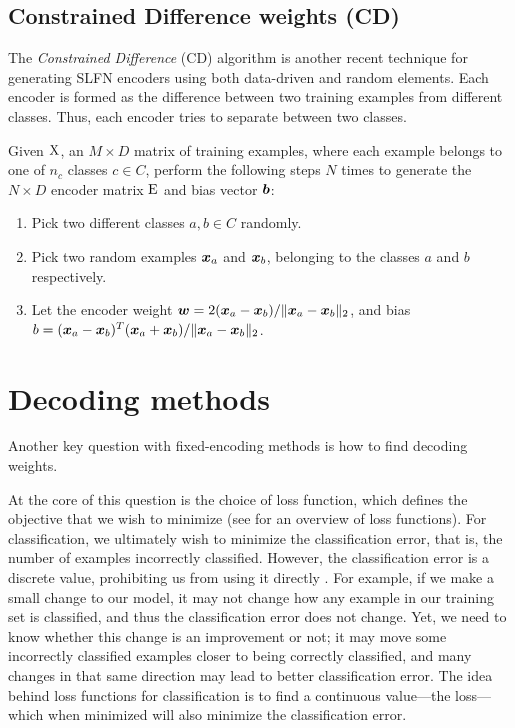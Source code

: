 \subsection{Constrained Difference weights (CD)}

The \emph{Constrained Difference} (CD) algorithm \parencite{Zhu2015}
is another recent technique for generating SLFN encoders
using both data-driven and random elements.
Each encoder is formed as the difference between two training examples
from different classes.
Thus, each encoder tries to separate between two classes.

Given $\mathrm{X}$, an $M \times D$ matrix of training examples,
where each example belongs to one of $n_c$ classes $c \in C$,
perform the following steps $N$ times
to generate the $N \times D$ encoder matrix $\mathrm{E}$
and bias vector $\boldsymbol{b}$:
\begin{enumerate}
  \item Pick two different classes $a, b \in C$ randomly.
  \item Pick two random examples $\boldsymbol{x}_a$ and $\boldsymbol{x}_b$,
    belonging to the classes $a$ and $b$ respectively.
  \item Let the encoder weight
    $\boldsymbol{w} = 2 (\boldsymbol{x}_a - \boldsymbol{x}_b) / \|\boldsymbol{x}_a - \boldsymbol{x}_b\|_2$,
    and bias $b = (\boldsymbol{x}_a - \boldsymbol{x}_b)^T (\boldsymbol{x}_a + \boldsymbol{x}_b) / \|\boldsymbol{x}_a - \boldsymbol{x}_b\|_2$.
\end{enumerate}


\section{Decoding methods}

Another key question with fixed-encoding methods
is how to find decoding weights.

At the core of this question is the choice of loss function,
which defines the objective that we wish to minimize
(see  for an overview of loss functions).
For classification, we ultimately wish to minimize the classification error,
that is, the number of examples incorrectly classified.
However, the classification error is a discrete value,
prohibiting us from using it directly \parencite{Toh2008}.
For example, if we make a small change to our model,
it may not change how any example in our training set is classified,
and thus the classification error does not change.
Yet, we need to know whether this change is an improvement or not;
it may move some incorrectly classified examples
closer to being correctly classified,
and many changes in that same direction may lead to better classification error.
The idea behind loss functions for classification
is to find a continuous value---the loss---%
which when minimized will also minimize the classification error.

